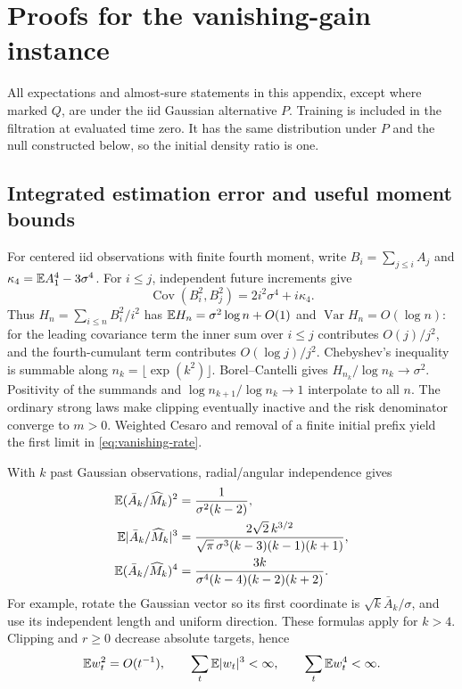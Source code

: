 \section{Proofs for the vanishing-gain instance}
\label{app:vanishing}
All expectations and almost-sure statements in this appendix, except where
marked $Q$, are under the iid Gaussian alternative $P$. Training is included
in the filtration at evaluated time zero. It has the same distribution under
$P$ and the null constructed below, so the initial density ratio is one.

\subsection{Integrated estimation error and useful moment bounds}
\label{app:vanishing-normalization}
For centered iid observations with finite fourth moment, write
$B_i=\sum_{j\le i}A_j$ and $\kappa_4=\mathbb E A_1^4-3\sigma^4$. For $i\le j$,
independent future increments give
\[
 \operatorname{Cov}(B_i^2,B_j^2)=2i^2\sigma^4+i\kappa_4.
\]
Thus $H_n=\sum_{i\le n}B_i^2/i^2$ has
$\mathbb E H_n=\sigma^2\log n+O(1)$ and $\operatorname{Var}H_n=O(\log n)$:
for the leading covariance term the inner sum over $i\le j$ contributes
$O(j)/j^2$, and the fourth-cumulant term contributes $O(\log j)/j^2$.
Chebyshev's inequality is summable along
$n_k=\lfloor\exp(k^2)\rfloor$. Borel--Cantelli gives
$H_{n_k}/\log n_k\to\sigma^2$. Positivity of the summands and
$\log n_{k+1}/\log n_k\to1$ interpolate to all $n$.
The ordinary strong laws make clipping eventually inactive and the risk
denominator converge to $m>0$. Weighted Cesaro and removal of a finite
initial prefix yield the first limit in \eqref{eq:vanishing-rate}.

With $k$ past Gaussian observations, radial/angular independence gives
\begin{align*}
 \mathbb E(\bar A_k/\widehat M_k)^2
   &=\frac1{\sigma^2(k-2)},\\
 \mathbb E|\bar A_k/\widehat M_k|^3
   &=\frac{2\sqrt2\,k^{3/2}}
       {\sqrt\pi\,\sigma^3(k-3)(k-1)(k+1)},\\
 \mathbb E(\bar A_k/\widehat M_k)^4
   &=\frac{3k}{\sigma^4(k-4)(k-2)(k+2)}.
\end{align*}
For example, rotate the Gaussian vector so its first coordinate is
$\sqrt{k}\bar A_k/\sigma$, and use its independent length and uniform
direction. These formulas apply for $k>4$. Clipping and $r\ge0$ decrease
absolute targets, hence
\begin{equation}
 \mathbb E w_t^2=O(t^{-1}),\qquad
 \sum_t\mathbb E|w_t|^3<\infty,\qquad \sum_t\mathbb E w_t^4<\infty.
 \label{eq:vanishing-moments}
\end{equation}

